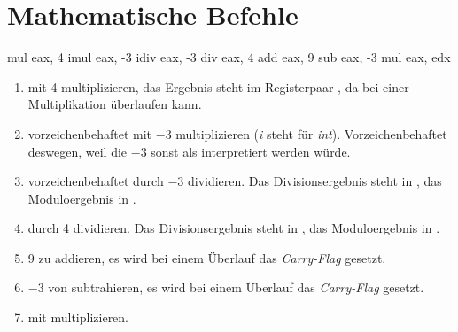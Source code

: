 \vfill{}

\section{Mathematische Befehle}
\begin{minipage}[t]{1\columnwidth}%
\begin{nasmcode}
mul eax, 4
imul eax, -3
idiv eax, -3
div eax, 4
add eax, 9
sub eax, -3
mul eax, edx
\end{nasmcode}

\begin{enumerate}
  \item {} mit 4 multiplizieren, das Ergebnis steht im Registerpaar , da  bei einer Multiplikation überlaufen kann.
  \item {} vorzeichenbehaftet mit $-3$ multiplizieren (\emph{i} steht für \emph{int}).
	Vorzeichenbehaftet deswegen, weil die $-3$ sonst als  interpretiert werden würde.
  \item {} vorzeichenbehaftet durch $-3$ dividieren.
    Das Divisionsergebnis steht in , das Moduloergebnis in .
  \item {} durch 4 dividieren.
    Das Divisionsergebnis steht in , das Moduloergebnis in .
  \item 9 zu  addieren, es wird bei einem Überlauf das \foreignlanguage{english}{\emph{Carry-Flag}} gesetzt.
  \item $-3$ von  subtrahieren, es wird bei einem Überlauf das \foreignlanguage{english}{\emph{Carry-Flag}} gesetzt.
  \item {} mit  multiplizieren.
\end{enumerate}
\end{minipage}

\vfill{}


